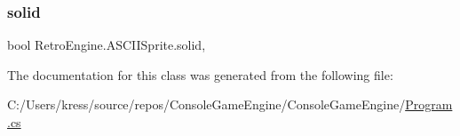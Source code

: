 \subsubsection{\texorpdfstring{solid}{solid}}
{\footnotesize\ttfamily bool Retro\+Engine.\+A\+S\+C\+I\+I\+Sprite.\+solid\hspace{0.3cm}{\ttfamily [get]}, {\ttfamily [set]}}



The documentation for this class was generated from the following file\+:\begin{DoxyCompactItemize}
\item 
C\+:/\+Users/kress/source/repos/\+Console\+Game\+Engine/\+Console\+Game\+Engine/\mbox{\hyperlink{_program_8cs}{Program.\+cs}}\end{DoxyCompactItemize}
